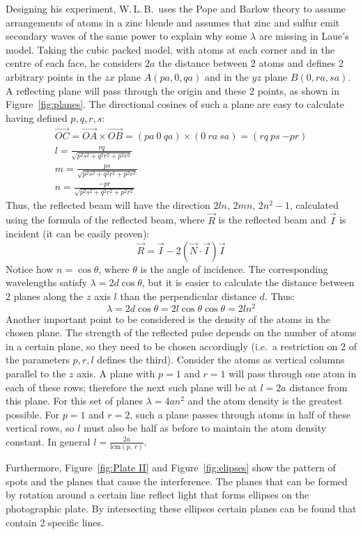 Designing his experiment, W.\,L.\,B.\ uses the Pope and Barlow theory to
assume arrangements of atoms in a zinc blende and assumes that zinc and sulfur
emit secondary waves of the same power to explain why some $\lambda$ are
missing in Laue's model.  Taking the cubic packed model, with atoms at each
corner and in the centre of each face, he considers $2a$ the distance between
2 atoms and defines 2 arbitrary points in the $zx$ plane $A(pa,0,qa)$ and in
the $yz$ plane $B(0,ra,sa)$.  A reflecting plane will pass through the origin
and these 2 points, as shown in Figure~\ref{fig:planes}.  The directional
cosines of such a plane are easy to calculate having defined $p, q, r, s$:
\begin{gather*}
    \vec{OC}=\vec{OA}\times\vec{OB}=(pa\ 0\ qa) \times (0\ ra\ sa)
             =(rq\ ps\ {-pr})\\
    l=\frac{rq}{\sqrt{p^2s^2+q^2r^2+p^2r^2}}\\
    m=\frac{ps}{\sqrt{p^2s^2+q^2r^2+p^2r^2}}\\
    n=\frac{-pr}{\sqrt{p^2s^2+q^2r^2+p^2r^2}}
\end{gather*}
Thus, the reflected beam will have the direction $2ln,\, 2mn,\, 2n^2-1$,
calculated using the formula of the reflected beam, where $\vec{R}$ is the
reflected beam and $\vec{I}$ is incident (it can be easily proven):
$$\vec{R}=\vec{I}-2(\vec{N}\cdot\vec{I})\vec{I}$$
Notice how $n=\cos{\theta}$, where $\theta$ is the angle of incidence.  The
corresponding wavelengths satisfy $\lambda=2d\cos{\theta}$, but it is easier
to calculate the distance between 2 planes along the $z$ axis $l$ than the
perpendicular distance $d$.  Thus:
$$\lambda=2d\cos{\theta}=2l\cos{\theta}\cos{\theta}=2ln^2$$
Another important point to be considered is the density of the atoms in the
chosen plane.  The strength of the reflected pulse depends on the number of
atoms in a certain plane, so they need to be chosen accordingly (i.e.\ a
restriction on 2 of the parameters $p, r, l$ defines the third).  Consider
the atoms as vertical columns parallel to the $z$ axis.  A plane with $p=1$
and $r=1$ will pass through one atom in each of these rows; therefore the next
such plane will be at $l=2a$ distance from this plane.  For this set of planes
$\lambda=4an^2$ and the atom density is the greatest possible.  For $p=1$ and
$r=2$, such a plane passes through atoms in half of these vertical rows, so
$l$ must also be half as before to maintain the atom density constant.  In
general $l=\frac{2a}{\mathrm{lcm}(p,\,r)}$.

Furthermore, Figure~\ref{fig:Plate II} and Figure~\ref{fig:elipses} show the
pattern of spots and the planes that cause the interference.  The planes that
can be formed by rotation around a certain line reflect light that forms
ellipses on the photographic plate.  By intersecting these ellipses certain
planes can be found that contain 2 specific lines.

